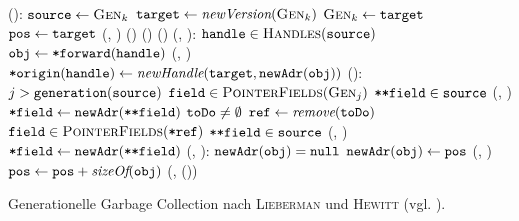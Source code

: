 \begin{algorithm}[h!]
\begin{algorithmic}[1]
	\State {}():
	\State \quad $\texttt{source} \gets \textsc{Gen}_k$
	\State \quad $\texttt{target} \gets \textit{newVersion}(\textsc{Gen}_k)$		
	\State \quad $\textsc{Gen}_k \gets \texttt{target}$
	\State \quad $\texttt{pos} \gets \texttt{target}$
	\State \quad {}(, )		
	\State \quad {}()		
	\State \quad {}()
	\State \quad {}()		
	\Statex
	\State {}(, ):
	\State \quad \FOREACH $\texttt{handle} \in \textsc{Handles}(\texttt{source})$		
	\State \quad \quad $\texttt{obj} \gets \texttt{*forward}(\texttt{handle})$
	\State \quad \quad {}(, )
	\State \quad \quad $\texttt{*origin}(\texttt{handle}) \gets \textit{newHandle}(\texttt{target}, \texttt{newAdr}(\texttt{obj}))$
	\Statex
	\State {}():
	\State \quad \FOREACH $j > \texttt{generation}(\texttt{source})$		
	\State \quad \quad \FOREACH $\texttt{field} \in \textsc{PointerFields}(\textsc{Gen}_j)$	
	\State \quad \quad \quad \IF $\texttt{**field} \in \texttt{source}$
	\State \quad \quad \quad \quad {}(, )
	\State \quad \quad \quad \quad $\texttt{*field} \gets \texttt{newAdr}(\texttt{**field})$
	\State \quad \WHILE $\texttt{toDo} \neq \emptyset$
	\State \quad \quad $\texttt{ref} \gets \textit{remove}(\texttt{toDo})$
	\State \quad \quad \FOREACH $\texttt{field} \in \textsc{PointerFields}(\texttt{*ref})$	
	\State \quad \quad \quad \IF $\texttt{**field} \in \texttt{source}$
	\State \quad \quad \quad \quad {}(, )
	\State \quad \quad \quad \quad $\texttt{*field} \gets \texttt{newAdr}(\texttt{**field})$
	\Statex
	\State {}(, ):
	\State \quad \IF $\texttt{newAdr}(\texttt{obj}) = \texttt{null}$		
	\State \quad \quad $\texttt{newAdr}(\texttt{obj}) \gets \texttt{pos}$
	\State \quad \quad {}(, )
	\State \quad \quad $\texttt{pos} \gets \texttt{pos} + \textit{sizeOf}(\texttt{obj})$
	\State \quad \quad {}(, ())
\end{algorithmic}
\caption[Generationelle Garbage Collection nach \textsc{Lieberman} und \textsc{Hewitt}]{Generationelle Garbage Collection nach \textsc{Lieberman} und \textsc{Hewitt} (vgl. \cite[S. 421ff]{lieberman1983}).}
\label{algo:lieberman}
\end{algorithm}

